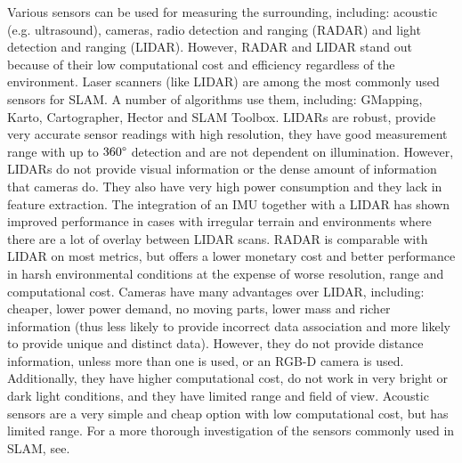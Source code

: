 Various sensors can be used for measuring the surrounding, including: acoustic (e.g. ultrasound), cameras, radio detection and ranging (RADAR) and light detection and ranging (LIDAR)\:\cite{khan_investigation_2022}. However, RADAR and LIDAR stand out because of their low computational cost and efficiency regardless of the environment\:\cite{khan_investigation_2022}.
Laser scanners (like LIDAR) are among the most commonly used sensors for SLAM\:\cite{siegwart_introduction_2011}\cite{corke_robotics_2023}\cite{macenski_slam_2021}. A number of algorithms use them, including:  GMapping, Karto, Cartographer, Hector and SLAM Toolbox\:\cite{macenski_slam_2021}.
LIDARs are robust, provide very accurate sensor readings with high resolution, they have good measurement range with up to $360 \degree$ detection and are not dependent on illumination\:\cite{khan_investigation_2022}\cite{filip_lidar_2023}\cite{macenski_slam_2021}. 
However, LIDARs do not provide visual information or the dense amount of information that cameras do\:\cite{siegwart_introduction_2011}. They also have very high power consumption and they lack in feature extraction\:\cite{khan_investigation_2022}.
The integration of an IMU together with a LIDAR has shown improved performance in cases with irregular terrain and environments where there are a lot of overlay between LIDAR scans\:\cite{fasiolo_comparing_2023}.
RADAR is comparable with LIDAR on most metrics, but offers a lower monetary cost and better performance in harsh environmental conditions at the expense of worse resolution, range and computational cost\:\cite{khan_investigation_2022}\cite{fritsche_fusing_2018}.
Cameras have many advantages over LIDAR, including: cheaper, lower power demand, no moving parts, lower mass and richer information (thus less likely to provide incorrect data association and more likely to provide unique and distinct data)\:\cite{khan_investigation_2022}\cite{siegwart_introduction_2011}. However, they do not provide distance information, unless more than one is used\:\cite{khan_investigation_2022}\cite{siegwart_introduction_2011}\cite{filip_lidar_2023}, or an RGB-D camera is used\:\cite{chen_slam_2022}. Additionally, they have higher computational cost\:\cite{khan_investigation_2022}, do not work in very bright or dark light conditions\:\cite{corke_robotics_2023}\cite{filip_lidar_2023}, and they have limited range and field of view\cite{fasiolo_comparing_2023}. 
Acoustic sensors are a very simple and cheap option with low computational cost, but has limited range\:\cite{khan_investigation_2022}.
For a more thorough investigation of the sensors commonly used in SLAM, see\:\cite{khan_investigation_2022}.

